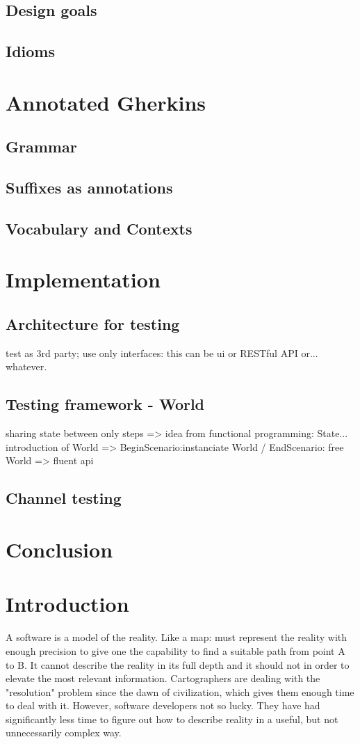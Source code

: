 \documentclass[conference]{IEEEtran}
\begin{document}
\subsection{Design goals}
\subsection{Idioms}

\section{Annotated Gherkins}
\subsection{Grammar}
\subsection{Suffixes as annotations}
\subsection{Vocabulary and Contexts}

\section{Implementation}
\subsection{Architecture for testing}
test as 3rd party; use only interfaces: this can be ui or RESTful API or... whatever.
\subsection{Testing framework - World}
sharing state between only steps => idea from functional programming: State... introduction of World => BeginScenario:instanciate World / EndScenario: free World => fluent api
\subsection{Channel testing}

\section{Conclusion}


\section{Introduction}
A software is a model of the reality. Like a map: must represent the reality with enough precision to give one the capability to find a suitable path from point A to B. It cannot describe the reality in its full depth and it should not in order to elevate the most relevant information. Cartographers are dealing with the "resolution" problem since the dawn of civilization, which gives them enough time to deal with it. However, software developers not so lucky. They have had significantly less time to figure out how to describe reality in a useful, but not unnecessarily complex way.
\end{document}
